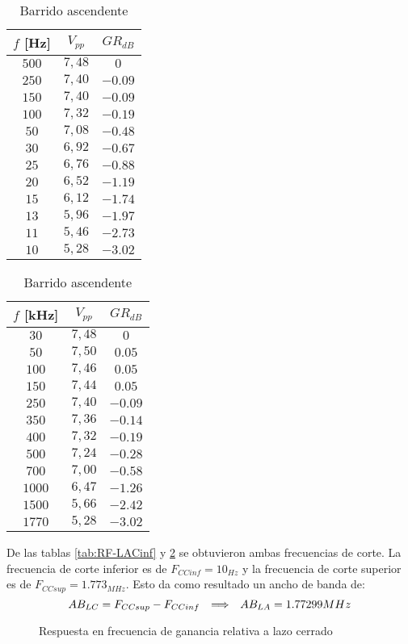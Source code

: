 \begin{table}[H]
\parbox{.45\textwidth}{  
    \centering
   \begin{tabular}{|c|c|c|}
        \hline
        $f$ [Hz] &  $V_{pp}$ & $GR_{dB}$\\
        \hline
         $500$&$7,48$&$0$\\ 
         $250$&$7,40$&$-0.09$\\ 
         $150$&$7,40$&$-0.09$\\ 
         $100$&$7,32$&$-0.19$\\ 
         $50$&$7,08$&$-0.48$\\
         $30$&$6,92$&$-0.67$\\
         $25$&$6,76$&$-0.88$\\
         $20$&$6,52$&$-1.19$\\
         $15$&$6,12$&$-1.74$\\
         $13$&$5,96$&$-1.97$\\
         $11$&$5,46$&$-2.73$\\
         $10$&$5,28$&$-3.02$\\
         \hline
    \end{tabular}
    \caption{Barrido descendente}
    \label{tab:RF-LACinf}
    }
    \parbox{.45\textwidth}{
    \centering
    \begin{tabular}{|c|c|c|}
        \hline
        $f$ [kHz] &  $V_{pp}$&$GR_{dB}$\\
        \hline
         $30$&$7,48$&$0$\\ 
         $50$&$7,50$&$0.05$\\ 
         $100$&$7,46$&$0.05$\\ 
         $150$&$7,44$&$0.05$\\
         $250$&$7,40$&$-0.09$\\
         $350$&$7,36$&$-0.14$\\
         $400$&$7,32$&$-0.19$\\
         $500$&$7,24$&$-0.28$\\
         $700$&$7,00$&$-0.58$\\
         $1000$&$6,47$&$-1.26$\\
         $1500$&$5,66$&$-2.42$\\
         $1770$&$5,28$&$-3.02$\\
         \hline
    \end{tabular}
    \caption{Barrido ascendente}
    \label{tab:RF-LACsup}
    }
\end{table}
De las tablas \ref{tab:RF-LACinf} y \ref{tab:RF-LACsup} se obtuvieron ambas frecuencias de corte. La frecuencia de corte inferior es de $F_{CCinf}=10_{Hz}$ y la frecuencia de corte superior es de $F_{CCsup}=1.773_{MHz}$. Esto da como resultado un ancho de banda de:
\begin{equation*}
    AB_{LC} = F_{CCsup}-F_{CCinf}\hspace{0.25cm} \Longrightarrow \hspace{0.25cm} AB_{LA}=1.77299 MHz
\end{equation*}
\begin{figure}[H]
    \centering
    
    \caption{Respuesta en frecuencia de ganancia relativa a lazo cerrado}
    \label{fig:RFC}
\end{figure}

